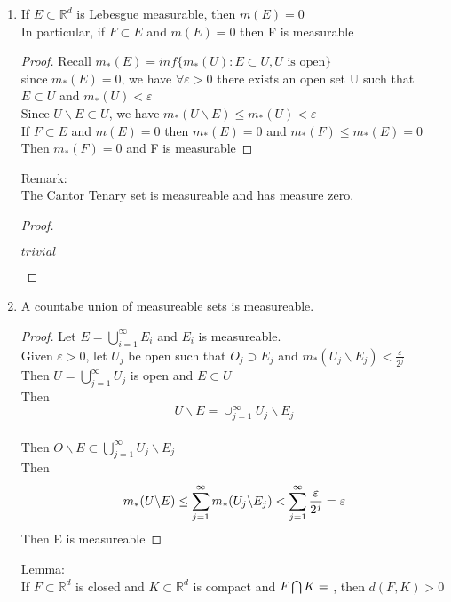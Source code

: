 \documentclass{article}[12 pt]
\begin{document}
\begin{enumerate}
	\item If $E \subset \mathbb{R}^d$ is Lebesgue measurable, then $m(E) = 0$\\
	      In particular, if $F \subset E$ and $m(E) = 0$ then F is measurable\\
	      \begin{proof}
		      Recall $m_{*}(E) = inf\{m_{*}(U) : E \subset U, U \text{ is open}\}$\\
		      since $m_{*}(E) = 0$, we have $\forall \varepsilon > 0$ there exists an open set U such that $E \subset U$ and $m_{*}(U) < \varepsilon$\\
		      Since $U\backslash E \subset U$, we have $m_{*}(U\backslash E) \leq m_{*}(U) < \varepsilon$\\
		      If $F \subset E$ and $m(E) = 0$ then $m_{*}(E) = 0$ and $m_{*}(F) \leq m_{*}(E) = 0$\\
		      Then $m_{*}(F) = 0$ and F is measurable
	      \end{proof}
	      Remark:\\
	      The Cantor Tenary set is measureable and has measure zero.\\
	      \begin{proof}
		      \begin{center}
			      $trivial$
		      \end{center}
	      \end{proof}
	\item A countabe union of measureable sets is measureable.\\
	      \begin{proof}
		      Let $E = \bigcup_{i=1}^{\infty}E_i$ and $E_i$ is measureable.\\
		      Given $\varepsilon > 0$, let $U_j$ be open such that $O_j \supset E_j$ and $m_{*}(U_j\backslash E_j) < \frac{\varepsilon}{2^j}$\\
		      Then $U = \bigcup_{j=1}^{\infty}U_j$ is open and $E \subset U$\\
		      Then $$U\backslash E = \cup_{j=1}^{\infty}U_j\backslash E_j$$\\
		      Then $O\backslash E \subset \bigcup_{j=1}^{\infty}U_j\backslash E_j$\\
		      Then
		      \begin{equation}
			      m_{*}(U\backslash E) \leq \sum_{j=1}^{\infty}m_{*}(U_j\backslash E_j) < \sum_{j=1}^{\infty}\frac{\varepsilon}{2^j}= \varepsilon\\
		      \end{equation}
		      Then E is measureable
	      \end{proof}
	      Lemma:\\
	      If $F\subset \mathbb{R}^d$ is closed and $K\subset\mathbb{R}^d$ is compact and $F\bigcap K = \null$, then $d(F,K) > 0$\\


\end{enumerate}
\end{document}
